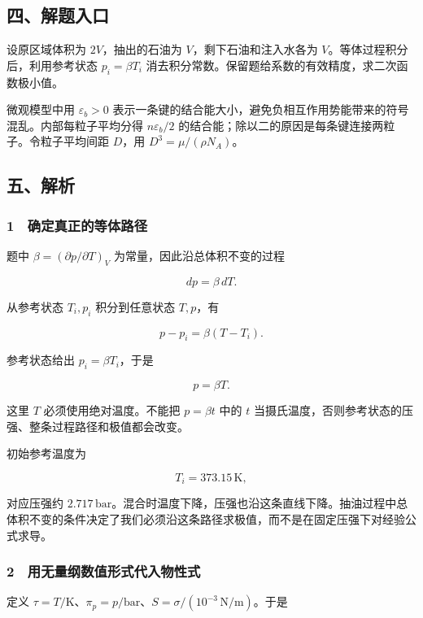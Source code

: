 \documentclass[12pt,a4paper,fontset=fandol]{ctexart}
\begin{document}
\subsection{四、解题入口}\label{ux56dbux89e3ux9898ux5165ux53e3-2}

设原区域体积为 \(2V\)，抽出的石油为 \(V\)，剩下石油和注入水各为
\(V\)。等体过程积分后，利用参考状态 \(p_i=\beta T_i\)
消去积分常数。保留题给系数的有效精度，求二次函数极小值。

微观模型中用 \(\varepsilon_b>0\)
表示一条键的结合能大小，避免负相互作用势能带来的符号混乱。内部每粒子平均分得
\(n\varepsilon_b/2\)
的结合能；除以二的原因是每条键连接两粒子。令粒子平均间距 \(D\)，用
\(D^3=\mu/(\rho N_A)\)。

\subsection{五、解析}\label{ux4e94ux89e3ux6790-2}

\subsubsection{1　确定真正的等体路径}\label{ux786eux5b9aux771fux6b63ux7684ux7b49ux4f53ux8defux5f84}

题中 \(\beta=(\partial p/\partial T)_V\) 为常量，因此沿总体积不变的过程

\[dp=\beta\,dT.\]

从参考状态 \(T_i,p_i\) 积分到任意状态 \(T,p\)，有

\[p-p_i=\beta(T-T_i).\]

参考状态给出 \(p_i=\beta T_i\)，于是

\[\boxed{p=\beta T.}\]

这里 \(T\) 必须使用绝对温度。不能把 \(p=\beta t\) 中的 \(t\)
当摄氏温度，否则参考状态的压强、整条过程路径和极值都会改变。

初始参考温度为

\[T_i=373.15\,\mathrm K,\]

对应压强约
\(2.717\,\mathrm{bar}\)。混合时温度下降，压强也沿这条直线下降。抽油过程中总体积不变的条件决定了我们必须沿这条路径求极值，而不是在固定压强下对经验公式求导。

\subsubsection{2　用无量纲数值形式代入物性式}\label{ux7528ux65e0ux91cfux7eb2ux6570ux503cux5f62ux5f0fux4ee3ux5165ux7269ux6027ux5f0f}

定义
\(\tau=T/\mathrm K\)、\(\pi_p=p/\mathrm{bar}\)、\(S=\sigma/(10^{-3}\,\mathrm{N/m})\)。于是
\end{document}
